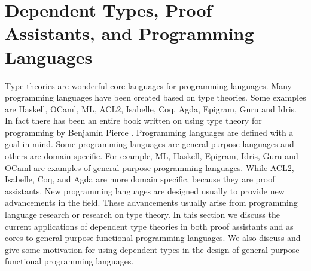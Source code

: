 \documentclass{article}
\begin{document}
\section{Dependent Types, Proof Assistants, and Programming Languages}
\label{sec:the_design_of_programming_languages}
Type theories are wonderful core languages for programming languages.
Many programming languages have been created based on type
theories. Some examples are Haskell, OCaml, ML, ACL2, Isabelle, Coq,
Agda, Epigram, Guru and Idris.  In fact there has been an entire book
written on using type theory for programming by Benjamin Pierce
\cite{Pierce:2002}.  Programming languages are defined with a goal in
mind.  Some programming languages are general purpose languages and
others are domain specific.  For example, ML, Haskell, Epigram, Idris,
Guru and OCaml are examples of general purpose programming
languages. While ACL2, Isabelle, Coq, and Agda are more domain
specific, because they are proof assistants. New programming languages
are designed usually to provide new advancements in the field.  These
advancements usually arise from programming language research or
research on type theory.  In this section we discuss the current
applications of dependent type theories in both proof assistants and
as cores to general purpose functional programming languages.  We also
discuss and give some motivation for using dependent types in the
design of general purpose functional programming languages.
\end{document}

